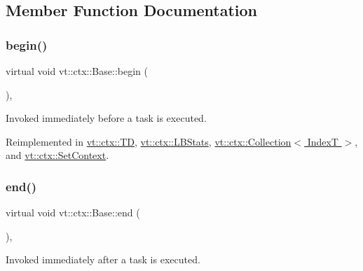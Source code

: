 \subsection{Member Function Documentation}
\mbox{\label{structvt_1_1ctx_1_1_base_aab5524952e1bb163ccba5df64a303168}} 
\subsubsection{\texorpdfstring{begin()}{begin()}}
{\footnotesize\ttfamily virtual void vt\+::ctx\+::\+Base\+::begin (\begin{DoxyParamCaption}{ }\end{DoxyParamCaption})\hspace{0.3cm}{\ttfamily [inline]}, {\ttfamily [virtual]}}



Invoked immediately before a task is executed. 



Reimplemented in \hyperlink{structvt_1_1ctx_1_1_t_d_a5ba29186cd3ac75a48272e0ac050228b}{vt\+::ctx\+::\+TD}, \hyperlink{structvt_1_1ctx_1_1_l_b_stats_a209aad8645b7e7a4328b71c29f935da4}{vt\+::ctx\+::\+L\+B\+Stats}, \hyperlink{structvt_1_1ctx_1_1_collection_a1555355c83dd6f692c03c66882b74846}{vt\+::ctx\+::\+Collection$<$ Index\+T $>$}, and \hyperlink{structvt_1_1ctx_1_1_set_context_aa882626f5fcf98cd6e8aa61c59395b5a}{vt\+::ctx\+::\+Set\+Context}.

\mbox{\label{structvt_1_1ctx_1_1_base_a113bac732b2831caa8eed11609ccaf0e}} 
\subsubsection{\texorpdfstring{end()}{end()}}
{\footnotesize\ttfamily virtual void vt\+::ctx\+::\+Base\+::end (\begin{DoxyParamCaption}{ }\end{DoxyParamCaption})\hspace{0.3cm}{\ttfamily [inline]}, {\ttfamily [virtual]}}



Invoked immediately after a task is executed. 



